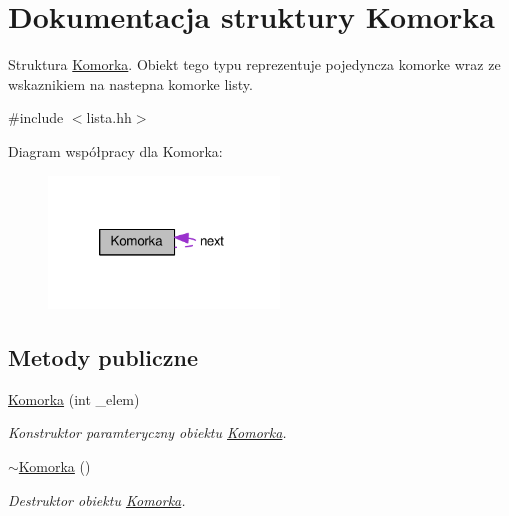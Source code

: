 \hypertarget{struct_komorka}{\section{Dokumentacja struktury Komorka}
\label{struct_komorka}
}


Struktura \hyperlink{struct_komorka}{Komorka}. Obiekt tego typu reprezentuje pojedyncza komorke wraz ze wskaznikiem na nastepna komorke listy.  




{\ttfamily \#include $<$lista.\-hh$>$}



Diagram współpracy dla Komorka\-:
\nopagebreak
\begin{figure}[H]
\begin{center}
\leavevmode
\includegraphics[width=174pt]{struct_komorka__coll__graph}
\end{center}
\end{figure}
\subsection*{Metody publiczne}
\begin{DoxyCompactItemize}
\item 
\hyperlink{struct_komorka_a643e9921895597e4d2243cd10b8ee856}{Komorka} (int \-\_\-elem)
\begin{DoxyCompactList}\small\item\em Konstruktor paramteryczny obiektu \hyperlink{struct_komorka}{Komorka}. \end{DoxyCompactList}\item 
\hyperlink{struct_komorka_a6e4b1985b1400b18a0561d8ca7e4768e}{$\sim$\-Komorka} ()
\begin{DoxyCompactList}\small\item\em Destruktor obiektu \hyperlink{struct_komorka}{Komorka}. \end{DoxyCompactList}\end{DoxyCompactItemize}
